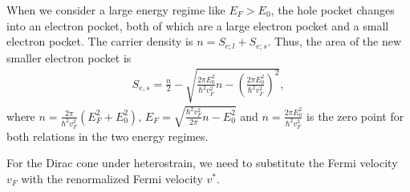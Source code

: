 \documentclass[10pt, oneside]{article}
\newcommand{\p}[1]{\left(#1\right)}
\begin{document}
When we consider a large energy regime like \(E_F > E_{0}\), the hole pocket changes into an electron pocket, both of which are a large electron pocket and a small electron pocket. The carrier density is \(n = S_{e;l} + S_{e;s}\). Thus, the area of the new smaller electron pocket is 
\begin{align}
	S_{e, s} = \frac{n}{2} - \sqrt{\frac{2 \pi E^2_0}{\hbar^2 v^2_{F}} n - \p{\frac{2 \pi E^2_0}{\hbar^2 v^2_{F}}}^2},
\end{align}
where \(n = \frac{2 \pi }{\hbar^2 v^2_{F}} \p{E^2_{F} + E^2_{0}}, \, E_{F} = \sqrt{\frac{\hbar^2 v^2_{F}}{2 \pi} n - E^2_0}\) and \(n = \frac{2 \pi E^2_0}{\hbar^2 v^2_{F}}\) is the zero point for both relations in the two energy regimes.  

For the Dirac cone under heterostrain, we need to substitute the Fermi velocity \(v_F\) with the renormalized Fermi velocity \(v^{*}\).
\end{document}
